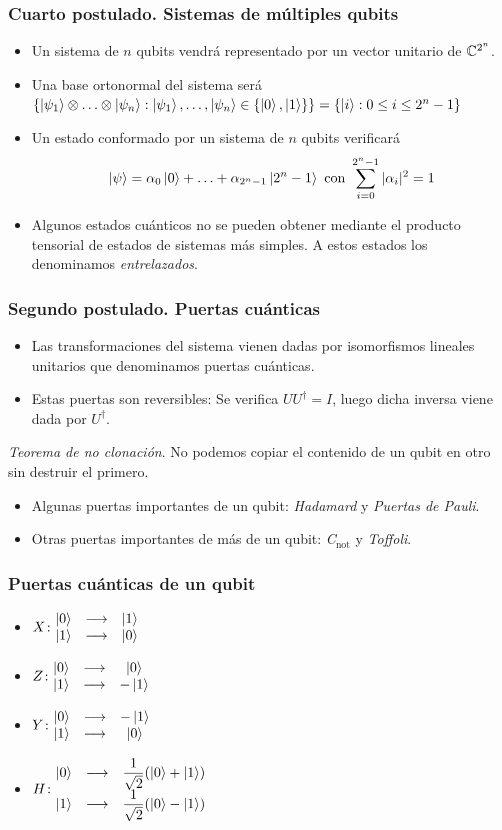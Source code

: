 \documentclass{beamer}
\begin{document}
\begin{frame}
	\frametitle{Cuarto postulado. Sistemas de múltiples qubits}
	
	\begin{itemize}
	\item Un sistema de $n$ qubits vendrá representado por un vector unitario de $\mathbb{C}^{2^n}$.
	\item Una base ortonormal del sistema será $\{\left|\psi_1\right\rangle\otimes\hdots\otimes\left|\psi_n\right\rangle:\left|\psi_1\right\rangle,\hdots,\left|\psi_n\right\rangle\in\{\left|0\right\rangle,\left|1\right\rangle\}\}=\{\left|i\right\rangle: 0\leq i\leq 2^n-1\}$
	\item Un estado conformado por un sistema de $n$ qubits verificará
	$$\left|\psi\right\rangle=\alpha_0\left|0\right\rangle+\hdots+\alpha_{2^n-1}\left|2^n-1\right\rangle\textrm{ con }\sum_{i=0}^{2^n-1}|\alpha_i|^2=1$$
	\item Algunos estados cuánticos no se pueden obtener mediante el producto tensorial de estados de sistemas más simples. A estos estados los denominamos \emph{entrelazados}.
	\end{itemize}
\end{frame}

\begin{frame}
	\frametitle{Segundo postulado. Puertas cuánticas}
	\begin{itemize}
 	\item Las transformaciones del sistema vienen dadas por isomorfismos lineales unitarios que denominamos puertas cuánticas.
 	\item Estas puertas son reversibles: Se verifica $UU^\dag=I$, luego dicha inversa viene dada por $U^\dag$.
	\end{itemize}
	\begin{thm} \emph{Teorema de no clonación}. No podemos copiar el contenido de un qubit en otro sin destruir el primero.
	\end{thm}
	\begin{itemize}
 	\item Algunas puertas importantes de un qubit: \emph{Hadamard} y \emph{Puertas de Pauli}.
 	\item Otras puertas importantes de más de un qubit: \emph{C$_\mathrm{not}$ } y \emph{Toffoli}.
	\end{itemize}
\end{frame}

\begin{frame}
	\frametitle{Puertas cuánticas de un qubit}
	\begin{itemize}
\item<1-> $X\colon \begin{matrix}\left|0\right\rangle&\longrightarrow& \left|1\right\rangle\\ \left|1\right\rangle&\longrightarrow& \left|0\right\rangle\end{matrix}$ 
\item<2-> $Z\colon \begin{matrix}\left|0\right\rangle&\longrightarrow& \left|0\right\rangle\\ \left|1\right\rangle&\longrightarrow& -\left|1\right\rangle\end{matrix}$
\item<3-> $Y\colon \begin{matrix}\left|0\right\rangle&\longrightarrow& -\left|1\right\rangle\\ \left|1\right\rangle&\longrightarrow& \left|0\right\rangle\end{matrix}$
\item<4-> $H\colon \begin{matrix}\left|0\right\rangle&\longrightarrow& \dfrac{1}{\sqrt{2}}(\left|0\right\rangle+\left|1\right\rangle)\\ \left|1\right\rangle&\longrightarrow& \dfrac{1}{\sqrt{2}}(\left|0\right\rangle-\left|1\right\rangle)\end{matrix}$
\end{itemize}
\end{frame}
\end{document}
